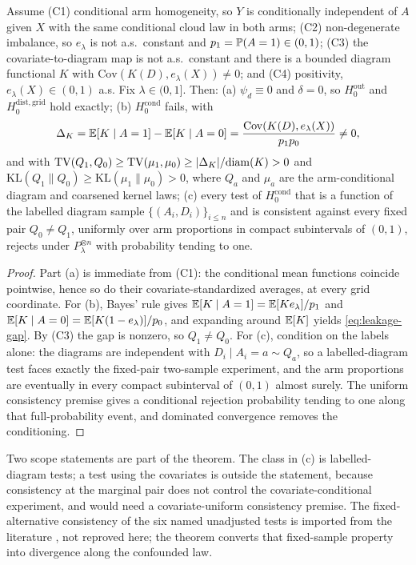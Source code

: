 \begin{theorem}
\label{thm:leakage}
Assume (C1) conditional arm homogeneity, so $Y$ is conditionally independent of $A$ given $X$ with the same conditional cloud law in both arms; (C2) non-degenerate imbalance, so $e_\lambda$ is not a.s.\ constant and $p_1=\mathbb{P}(A=1)\in(0,1)$; (C3) the covariate-to-diagram map is not a.s.\ constant and there is a bounded diagram functional $K$ with $\mathrm{Cov}(K(D),e_\lambda(X))\ne0$; and (C4) positivity, $e_\lambda(X)\in(0,1)$ a.s. Fix $\lambda\in(0,1]$. Then:
(a) $\psi_d\equiv0$ and $\delta=0$, so $H_0^{\mathrm{out}}$ and $H_0^{\mathrm{dist,grid}}$ hold exactly;
(b) $H_0^{\mathrm{cond}}$ fails, with
\begin{equation}
\Delta_K=\mathbb{E}[K\mid A=1]-\mathbb{E}[K\mid A=0]=\frac{\mathrm{Cov}(K(D),e_\lambda(X))}{p_1p_0}\ne0,
\label{eq:leakage-gap}
\end{equation}
and with $\mathrm{TV}(Q_1,Q_0)\ge\mathrm{TV}(\mu_1,\mu_0)\ge\lvert \Delta_K\rvert/\mathrm{diam}(K)>0$ and $\mathrm{KL}(Q_1\|Q_0)\ge\mathrm{KL}(\mu_1\|\mu_0)>0$, where $Q_a$ and $\mu_a$ are the arm-conditional diagram and coarsened kernel laws;
(c) every test of $H_0^{\mathrm{cond}}$ that is a function of the labelled diagram sample $\{(A_i,D_i)\}_{i\le n}$ and is consistent against every fixed pair $Q_0\ne Q_1$, uniformly over arm proportions in compact subintervals of $(0,1)$, rejects under $P_\lambda^{\otimes n}$ with probability tending to one.
\end{theorem}

\begin{proof}
Part (a) is immediate from (C1): the conditional mean functions coincide pointwise, hence so do their covariate-standardized averages, at every grid coordinate. For (b), Bayes' rule gives $\mathbb{E}[K\mid A=1]=\mathbb{E}[Ke_\lambda]/p_1$ and $\mathbb{E}[K\mid A=0]=\mathbb{E}[K(1-e_\lambda)]/p_0$, and expanding around $\mathbb{E}[K]$ yields \eqref{eq:leakage-gap}. By (C3) the gap is nonzero, so $Q_1\ne Q_0$. For (c), condition on the labels alone: the diagrams are independent with $D_i\mid A_i=a\sim Q_a$, so a labelled-diagram test faces exactly the fixed-pair two-sample experiment, and the arm proportions are eventually in every compact subinterval of $(0,1)$ almost surely. The uniform consistency premise gives a conditional rejection probability tending to one along that full-probability event, and dominated convergence removes the conditioning.
\end{proof}

Two scope statements are part of the theorem. The class in (c) is labelled-diagram tests; a test using the covariates is outside the statement, because consistency at the marginal pair does not control the covariate-conditional experiment, and would need a covariate-uniform consistency premise. The fixed-alternative consistency of the six named unadjusted tests is imported from the literature \citep{robinson_turner_2017,gretton_2012,han_kim_kim_2026,murris_strand_2026,moon_lazar_2023,dubey_muller_2019}, not reproved here; the theorem converts that fixed-sample property into divergence along the confounded law.

